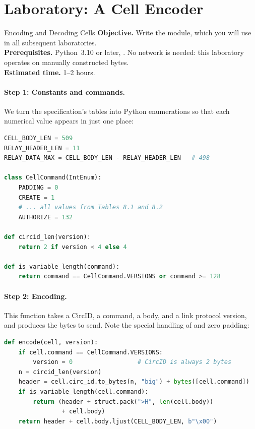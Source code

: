 \section{Laboratory: A Cell Encoder}\label{sec:lab-celle}

\begin{laboratorio}[2]{Encoding and Decoding Cells}
\textbf{Objective.} Write the  module, which you will use in all subsequent laboratories.\\
\textbf{Prerequisites.} Python~3.10 or later, . No network is needed: this laboratory operates on manually constructed bytes.\\
\textbf{Estimated time.} 1--2 hours.
\end{laboratorio}

\paragraph{Step 1: Constants and commands.} We turn the specification's tables into Python enumerations so that each numerical value appears in just one place:

\begin{lstlisting}[language=Python]
CELL_BODY_LEN = 509
RELAY_HEADER_LEN = 11
RELAY_DATA_MAX = CELL_BODY_LEN - RELAY_HEADER_LEN   # 498

class CellCommand(IntEnum):
    PADDING = 0
    CREATE = 1
    # ... all values from Tables 8.1 and 8.2
    AUTHORIZE = 132

def circid_len(version):
    return 2 if version < 4 else 4

def is_variable_length(command):
    return command == CellCommand.VERSIONS or command >= 128
\end{lstlisting}

\paragraph{Step 2: Encoding.} This function takes a CircID, a command, a body, and a link protocol version, and produces the bytes to send. Note the special handling of  and zero padding:

\begin{lstlisting}[language=Python]
def encode(cell, version):
    if cell.command == CellCommand.VERSIONS:
        version = 0                  # CircID is always 2 bytes
    n = circid_len(version)
    header = cell.circ_id.to_bytes(n, "big") + bytes([cell.command])
    if is_variable_length(cell.command):
        return (header + struct.pack(">H", len(cell.body))
                + cell.body)
    return header + cell.body.ljust(CELL_BODY_LEN, b"\x00")
\end{lstlisting}

